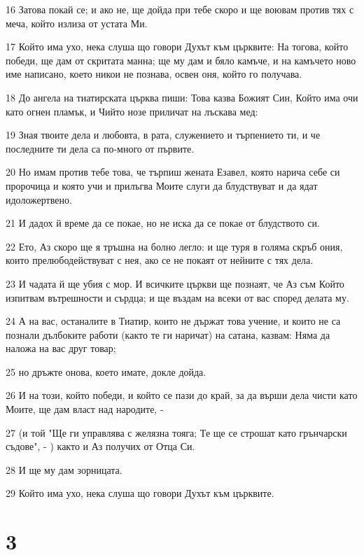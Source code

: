 \par 16 Затова покай се; и ако не, ще дойда при тебе скоро и ще воювам против тях с меча, който излиза от устата Ми.
\par 17 Който има ухо, нека слуша що говори Духът към църквите: На тогова, който победи, ще дам от скритата манна; ще му дам и бяло камъче, и на камъчето ново име написано, което никои не познава, освен оня, който го получава.
\par 18 До ангела на тиатирската църква пиши: Това казва Божият Син, Който има очи като огнен пламък, и Чийто нозе приличат на лъскава мед:
\par 19 Зная твоите дела и любовта, в рата, служението и търпението ти, и че последните ти дела са по-много от първите.
\par 20 Но имам против тебе това, че търпиш жената Езавел, която нарича себе си пророчица и която учи и прилъгва Моите слуги да блудствуват и да ядат идоложертвено.
\par 21 И дадох й време да се покае, но не иска да се покае от блудството си.
\par 22 Ето, Аз скоро ще я тръшна на болно легло: и ще туря в голяма скръб ония, които прелюбодействуват с нея, ако се не покаят от нейните с тях дела.
\par 23 И чадата й ще убия с мор. И всичките църкви ще познаят, че Аз съм Който изпитвам вътрешности и сърдца; и ще въздам на всеки от вас според делата му.
\par 24 А на вас, останалите в Тиатир, които не държат това учение, и които не са познали дълбоките работи (както те ги наричат) на сатана, казвам: Няма да наложа на вас друг товар;
\par 25 но дръжте онова, което имате, докле дойда.
\par 26 И на този, който победи, и който се пази до край, за да върши дела чисти като Моите, ще дам власт над народите, -
\par 27 (и той "Ще ги управлява с желязна тояга; Те ще се строшат като грънчарски съдове", - ) както и Аз получих от Отца Си.
\par 28 И ще му дам зорницата.
\par 29 Който има ухо, нека слуша що говори Духът към църквите.

\chapter{3}

